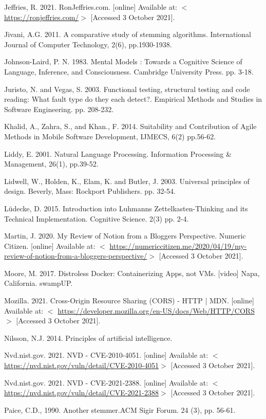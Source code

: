 \documentclass{article}
\begin{document}
{Jeffries, R. 2021. RonJeffries.com. [online] Available at: $<$ \url{https://ronjeffries.com/}$>$ [Accessed 3 October 2021].

Jivani, A.G. 2011. A comparative study of stemming algorithms. International Journal of Computer Technology, 2(6), pp.1930-1938.

Johnson-Laird, P. N. 1983. Mental Models : Towards a Cognitive Science of Language, Inference, and Consciousness. Cambridge University Press. pp. 3-18.

Juristo, N. and Vegas, S. 2003. Functional testing, structural testing and code reading: What fault type do they each detect?. Empirical Methods and Studies in Software Engineering. pp. 208-232. 

Khalid, A., Zahra, S., and Khan., F. 2014. Suitability and Contribution of Agile Methods in Mobile Software Development, IJMECS, 6(2) pp.56-62.

Liddy, E. 2001. Natural Language Processing. Information Processing & Management, 26(1), pp.39-52.

Lidwell, W., Holden, K., Elam, K. and Butler, J. 2003. Universal principles of design. Beverly, Mass: Rockport Publishers. pp. 32-54.

Lüdecke, D. 2015. Introduction into Luhmanns Zettelkasten-Thinking and its Technical Implementation. Cognitive Science. 2(3) pp. 2-4.

Martin, J. 2020. My Review of Notion from a Bloggers Perspective. Numeric Citizen. [online] Available at: $<$ \url{https://numericcitizen.me/2020/04/19/my-review-of-notion-from-a-bloggers-perspective/}$>$ [Accessed 3 October 2021].

Moore, M. 2017. Distroless Docker: Containerizing Apps, not VMs. [video] Napa, California. swampUP.

Mozilla. 2021. Cross-Origin Resource Sharing (CORS) - HTTP | MDN. [online] Available at: $<$ \url{https://developer.mozilla.org/en-US/docs/Web/HTTP/CORS}$>$ [Accessed 3 October 2021].

Nilsson, N.J. 2014. Principles of artificial intelligence.

Nvd.nist.gov. 2021. NVD - CVE-2010-4051. [online] Available at: $<$ \url{https://nvd.nist.gov/vuln/detail/CVE-2010-4051}$>$ [Accessed 3 October 2021].

Nvd.nist.gov. 2021. NVD - CVE-2021-2388. [online] Available at: $<$ \url{https://nvd.nist.gov/vuln/detail/CVE-2021-2388}$>$ [Accessed 3 October 2021].

Paice, C.D., 1990. Another stemmer.ACM Sigir Forum. 24 (3), pp. 56-61.

}
\end{document}
